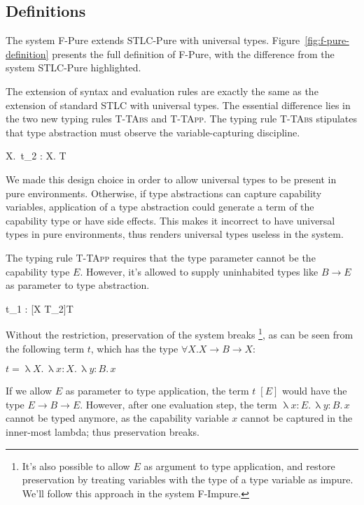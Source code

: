 \subsection{Definitions}

The system F-Pure extends STLC-Pure with universal
types. Figure~\ref{fig:f-pure-definition} presents the full definition
of F-Pure, with the difference from the system STLC-Pure highlighted.

The extension of syntax and evaluation rules are exactly the same as
the extension of standard STLC with universal types.  The essential
difference lies in the two new typing rules \textsc{T-TAbs} and
\textsc{T-TApp}. The typing rule \textsc{T-TAbs} stipulates that type
abstraction must observe the variable-capturing discipline.

{ \Gamma \vdash \uplambda X.\, t_2 : \forall X. T }

We made this design choice in order to allow universal types to be
present in pure environments. Otherwise, if type abstractions can
capture capability variables, application of a type abstraction could
generate a term of the capability type or have side effects. This
makes it incorrect to have universal types in pure environments, thus
renders universal types useless in the system.

The typing rule \textsc{T-TApp} requires that the type parameter
cannot be the capability type $E$. However, it's allowed to supply
uninhabited types like $B \to E$ as parameter to type abstraction.


{ \Gamma \vdash t_1 \; [T_2] : [X \mapsto T_2]T }

Without the restriction, preservation of the system breaks
\footnote{It's also possible to allow $E$ as argument to type
  application, and restore preservation by treating variables with the
  type of a type variable as impure. We'll follow this approach in the
  system F-Impure.}, as can be seen from the following term $t$, which
has the type $\forall X. X \to B \to X$:

\begin{center}
  $t = \uplambda X. \, \uplambda x{:}X. \, \uplambda y{:}B. \, x$
\end{center}

If we allow $E$ as parameter to type application, the term $t \; [E]$
would have the type $E \to B \to E$. However, after one evaluation
step, the term $\uplambda x{:}E. \, \uplambda y{:}B. \, x$ cannot be
typed anymore, as the capability variable $x$ cannot be captured in
the inner-most lambda; thus preservation breaks.

